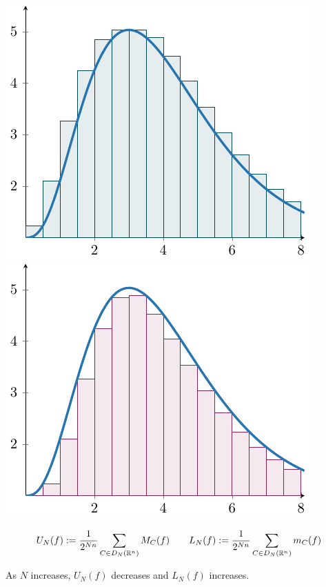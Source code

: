     \begin{center}
        \includegraphics{chapters/4-IntegrationRn/figures/figures-upperdarboux.pdf}
        \includegraphics{chapters/4-IntegrationRn/figures/figures-lowerdarboux.pdf}
    \end{center}

    \begin{proposition}
    $$U_N(f) := \frac{1}{2^{Nn}} \sum_{C \in D_N(\mathbb{R}^n)} M_C(f)  \qquad L_N(f) := \frac{1}{2^{Nn}}\sum_{C \in D_N(\mathbb{R}^n)} m_C(f)$$
    \end{proposition}
    
    \begin{proposition}\label{darbouxmonotone}
    As $N$ increases, $U_N(f)$ decreases and $L_N(f)$ increases.
    \end{proposition}

